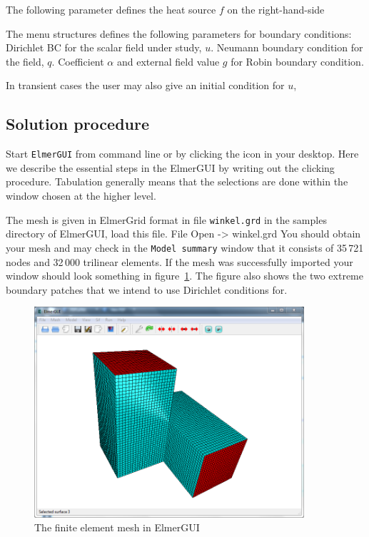 \noindent
The following parameter defines the heat source $f$ on the right-hand-side
\sifbegin
{}
\sifend

\noindent
The menu structures defines the following parameters for boundary conditions:
\sifbegin
{}
Dirichlet BC for the scalar field under study, $u$.
Neumann boundary condition for the field, $q$.
Coefficient $\alpha$ and external field value $g$ for Robin boundary condition.
\sifend

\noindent
In transient cases the user may also give an initial condition for $u$, 
\sifbegin
{}
\sifend


\subsection*{Solution procedure}

Start \texttt{ElmerGUI} from command line or by clicking the icon in your desktop. Here we describe 
the essential steps in the ElmerGUI by writing out the clicking procedure. Tabulation generally means that the selections are done within the window chosen at the higher level. 

The mesh is given in ElmerGrid format in file \texttt{winkel.grd} in the samples directory of ElmerGUI, 
load this file.
\ttbegin
File 
  Open -> winkel.grd
\ttend
You should obtain your mesh and may check in the \texttt{Model summary} 
window that it consists of 35\,721 nodes and 32\,000 trilinear elements.
If the mesh was successfully imported your window should look something in figure~\ref{fg:modelpde1}.
The figure also shows the two extreme boundary patches that we intend to use Dirichlet conditions
for. 
\begin{figure}
\begin{center}
\includegraphics[width=100mm]{ModelPDE_Mesh.PNG}
\caption{The finite element mesh in ElmerGUI}\label{fg:modelpde1}
\end{center}
\end{figure}

